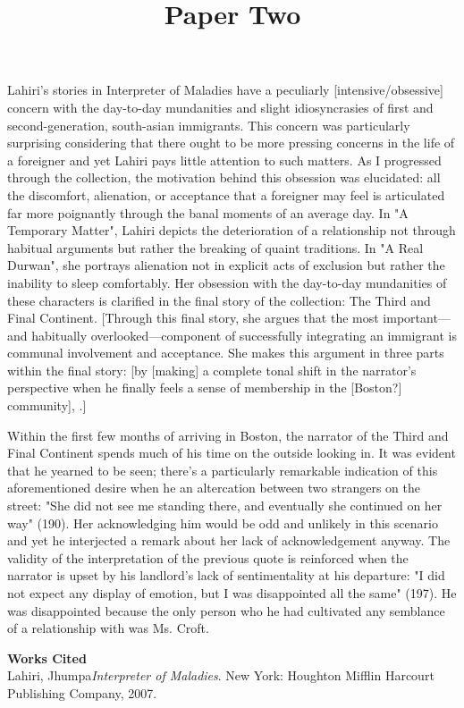 \documentclass[12pt]{article}
\title{Paper Two}
\date{}
\begin{document}
\maketitle
\doublespacing

\thispagestyle{firststyle}

%       
%
Lahiri's stories in Interpreter of Maladies have a peculiarly [intensive/obsessive] concern with the day-to-day mundanities and slight idiosyncrasies of first and second-generation, south-asian immigrants. This concern was particularly surprising considering that there ought to be more pressing concerns in the life of a foreigner and yet Lahiri pays little attention to such matters.
As I progressed through the collection, the motivation behind this obsession was elucidated: all the discomfort, alienation, or acceptance that a foreigner may feel is articulated far more poignantly through the banal moments of an average day. 
In "A Temporary Matter", Lahiri depicts the deterioration of a relationship not through habitual arguments but rather the breaking of quaint traditions. In "A Real Durwan", she portrays alienation not in explicit acts of exclusion but rather the inability to sleep comfortably. Her obsession with the day-to-day mundanities of these characters is clarified in the final story of the collection: The Third and Final Continent. [Through this final story, she argues that the most important---and habitually overlooked---component of successfully integrating an immigrant is communal involvement and acceptance. She makes this argument in three parts within the final story: [by [making] a complete tonal shift in the narrator's perspective when he finally feels a sense of membership in the [Boston?] community], .] 

Within the first few months of arriving in Boston, the narrator of the Third and Final Continent spends much of his time on the outside looking in. It was evident that he yearned to be seen; there's a particularly remarkable indication of this aforementioned desire when he an altercation between two strangers on the street: "She did not see me standing there, and eventually she continued on her way" (190). Her acknowledging him would be odd and unlikely in this scenario and yet he interjected a remark about her lack of acknowledgement anyway. The validity of the interpretation of the previous quote is reinforced when the narrator is upset by his landlord's lack of sentimentality at his departure: "I did not expect any display of emotion, but I was disappointed all the same" (197). He was disappointed because the only person who he had cultivated any semblance of a relationship with was Ms. Croft.

\begin{center}
  \textbf{Works Cited} \\
Lahiri, Jhumpa\textit{Interpreter of Maladies}. New York: Houghton Mifflin Harcourt Publishing Company, 2007.
\end{center}
\end{document}
